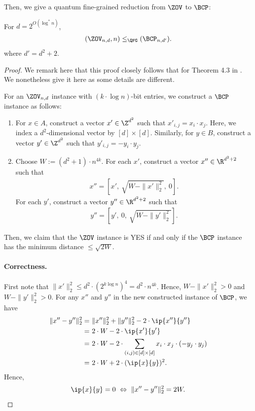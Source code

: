 Then, we give a quantum fine-grained reduction from $\ZOV$ to $\BCP$:
\begin{lemma}\label{lem:zov_2_bcp}
For $d=2^{O(\log^* n)}$,
\begin{align}
    (\ZOV_{n,d}, n)\leq_{\QFG} (\BCP_{n,d'}).
\end{align}
where $d'=d^2+2$.
\end{lemma}
\begin{proof}
We remark here that this proof closely follows that for Theorem 4.3 in \cite{r17}. We nonetheless give it here as some details are different.

For an $\ZOV_{n,d}$ instance with $(k\cdot \log n)$-bit entries, we construct a $\BCP$ instance as follows:
\begin{enumerate}
    \item For $x\in A$, construct a vector $x'\in \Z^{d^2}$ such that $x'_{i,j}=x_i\cdot x_j$. Here, we index a $d^2$-dimensional vector by $[d]\times [d]$. Similarly, for $y\in B$, construct a vector $y'\in \Z^{d^2}$ such that $y'_{i,j}=-y_i \cdot y_j$.
    \item Choose $W:=(d^2+1)\cdot n^{4k}$. For each $x'$, construct a vector $x''\in \R^{d^2+2}$ such that 
    \begin{align}
        x''=\left[x',~ \sqrt{W-\|x'\|_2^2},~ 0\right].
    \end{align}  For each $y'$, construct a vector $y''\in \R^{d^2+2}$ such that 
    \begin{align}
        y''=\left[y',~ 0, ~ \sqrt{W-\|y'\|_2^2}\right].
    \end{align}
\end{enumerate}
Then, we claim that the $\ZOV$ instance is YES if and only if the $\BCP$ instance has the minimum distance $\leq \sqrt{2W}$.

\paragraph*{Correctness.} First note that $\|x'\|_2^2\leq d^2\cdot (2^{k\log n})^4=d^2\cdot n^{4k}$. Hence, $W-\|x'\|_2^2 > 0$ and $W-\|y'\|_2^2>0$. For any $x''$ and $y''$ in the new constructed instance of $\BCP$, we have
\begin{align}
    \|x''-y''\|_2^2=&~ \|x''\|_2^2+\|y''\|_2^2-2\cdot \ip{x''}{y''}\\
    =&~ 2\cdot W-2\cdot \ip{x'}{y'}\\
    =&~ 2\cdot W - 2\cdot \sum_{(i,j)\in [d]\times [d]}x_i\cdot x_j\cdot (-y_j\cdot y_j)\\
    =&~ 2\cdot W + 2\cdot (\ip{x}{y})^2.
\end{align}
Hence,
\begin{align}
    \ip{x}{y}=0~\Leftrightarrow~\|x''-y''\|_2^2= 2W.
\end{align}


\end{proof}
